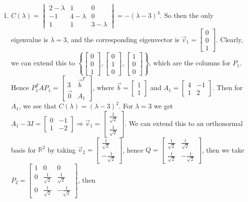 \documentclass[10pt,english]{article}
\begin{document}
\begin{enumerate}
\pagebreak
\item $C(\lambda)=\begin{vmatrix}2-\lambda&1&0\\-1&4-\lambda&0\\1&1&3-\lambda\end{vmatrix}=-(\lambda-3)^3$. So then the only eigenvalue is $\lambda=3$, and the corresponding eigenvector is $\vec{v}_1=\begin{bmatrix}0\\0\\1\end{bmatrix}$. Clearly, we can extend this to $\left\{\begin{bmatrix}0\\0\\1\end{bmatrix},\begin{bmatrix}0\\1\\0\end{bmatrix},\begin{bmatrix}1\\0\\0\end{bmatrix}\right\}$, which are the columns for $P_1$. Hence $P_1^TAP_1=\begin{bmatrix}3&\vec{b}^T\\\vec{0}&A_1\end{bmatrix}$, where $\vec{b}=\begin{bmatrix}1\\1\end{bmatrix}$ and $A_1=\begin{bmatrix}4&-1\\1&2\end{bmatrix}$. Then for $A_1$, we see that $C(\lambda)=(\lambda-3)^2$. For $\lambda=3$ we get $A_1-3I=\begin{bmatrix}0&-1\\1&-2\end{bmatrix}\Rightarrow \vec{v}_1=\begin{bmatrix}\frac{1}{\sqrt{2}}\\\frac{1}{\sqrt{2}}\end{bmatrix}$. We can extend this to an orthonormal basis for $\mathbb{R}^2$ by taking $\vec{v}_2=\begin{bmatrix}\frac{1}{\sqrt{2}}\\-\frac{1}{\sqrt{2}}\end{bmatrix}$, hence $Q=\begin{bmatrix}\frac{1}{\sqrt{2}}&\frac{1}{\sqrt{2}}\\\frac{1}{\sqrt{2}}&-\frac{1}{\sqrt{2}}\end{bmatrix}$, then we take $P_2=\begin{bmatrix}1&0&0\\0&\frac{1}{\sqrt{2}}&\frac{1}{\sqrt{2}}\\0&\frac{1}{\sqrt{2}}&-\frac{1}{\sqrt{2}}\end{bmatrix}$, then 
\end{enumerate}
\end{document}

